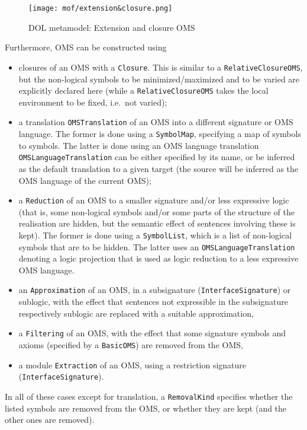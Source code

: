 \documentclass[10pt, a4paper]{isov2}
\newcommand*{\termref}[1]{\index{#1}#1\xspace}
\newcommand*{\syntax}[1]{\texttt{#1}}
\begin{document}
\medskip
\begin{figure}
  \centering
    \texttt{[image: mof/extension\&closure.png]}
  \caption{DOL metamodel: Extension and closure OMS}
  \label{fig:extension&closure}
\end{figure}


Furthermore, OMS can be constructed using 
\begin{itemize}
\item  closures of an OMS with a \syntax{Closure}.  This is
  similar to a \syntax{RelativeClosureOMS}, but the non-logical
  symbols to be  minimized/maximized and to be varied are
  explicitly declared here (while a \syntax{RelativeClosureOMS} takes
  the local environment to be fixed, i.e.\ not varied);
\item a translation \syntax{OMSTranslation} of an OMS into a different
  signature or OMS language. The former is done using a \syntax{SymbolMap},
  specifying a map of symbols to symbols. The latter is done using an 
  OMS language
  translation \syntax{OMSLanguageTranslation} can be either specified
  by its name, or be inferred as the \termref{default translation} to
  a given target (the source will be inferred as the OMS language of
  the current OMS);
\item a \syntax{Reduction} of an OMS to a smaller signature and/or
  less expressive logic (that is, some non-logical symbols and/or some
  parts of the structure of the realisation are hidden, 
  but the semantic effect of
  sentences involving these is kept). The former is done using a
  \syntax{SymbolList}, which is a list of non-logical symbols that are
  to be hidden. The latter uses an \syntax{OMSLanguageTranslation}
  denoting a logic projection that is used as logic reduction to a
  less expressive OMS language.
\item an \syntax{Approximation} of an OMS, in a subsignature (\syntax{InterfaceSignature}) or sublogic, with the effect that sentences not expressible in the subsignature respectively sublogic are replaced with a suitable approximation,
\item a \syntax{Filtering} of an OMS, with the effect that some signature symbols and axioms (specified by a \syntax{BasicOMS}) are removed from the OMS,
\item a module \syntax{Extraction} of an OMS, using a restriction signature (\syntax{InterfaceSignature}).
\end{itemize}
In all of these cases except for translation, a \syntax{RemovalKind}
specifies whether the listed symbols are removed from the OMS, or
whether they are kept (and the other ones are removed).
\end{document}
